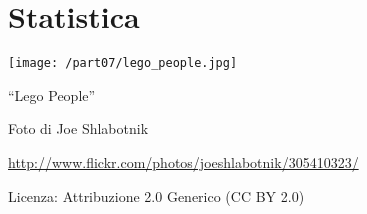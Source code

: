 \part{Statistica}
\texttt{[image: /part07/lego\_people.jpg]}
  \begin{center}
    {\large ``Lego People''}\par
    Foto di Joe Shlabotnik\par
    \url{http://www.flickr.com/photos/joeshlabotnik/305410323/}\par
    Licenza: Attribuzione 2.0 Generico (CC BY 2.0)\par
  \end{center}
\clearpage
\cleardoublepage
